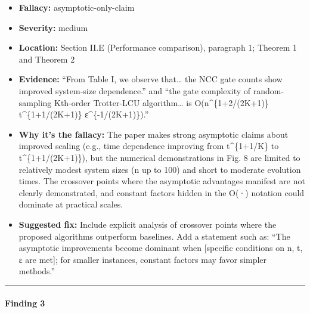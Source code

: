 \documentclass[10pt,letterpaper]{article}
\providecommand{\tightlist}{\setlength{\itemsep}{0pt}\setlength{\parskip}{0pt}}
\begin{document}
\begin{itemize}
\tightlist
\item
  \textbf{Fallacy:} asymptotic-only-claim
\item
  \textbf{Severity:} medium
\item
  \textbf{Location:} Section II.E (Performance comparison), paragraph 1; Theorem 1 and Theorem 2
\item
  \textbf{Evidence:} ``From Table I, we observe that\ldots{} the NCC gate counts show improved system-size dependence.'' and ``the gate complexity of random-sampling Kth-order Trotter-LCU algorithm\ldots{} is O(n\^{}\{1+2/(2K+1)\} t\^{}\{1+1/(2K+1)\} ε\^{}\{-1/(2K+1)\}).''
\item
  \textbf{Why it's the fallacy:} The paper makes strong asymptotic claims about improved scaling (e.g., time dependence improving from t\^{}\{1+1/K\} to t\^{}\{1+1/(2K+1)\}), but the numerical demonstrations in Fig. 8 are limited to relatively modest system sizes (n up to 100) and short to moderate evolution times. The crossover points where the asymptotic advantages manifest are not clearly demonstrated, and constant factors hidden in the O(·) notation could dominate at practical scales.
\item
  \textbf{Suggested fix:} Include explicit analysis of crossover points where the proposed algorithms outperform baselines. Add a statement such as: ``The asymptotic improvements become dominant when {[}specific conditions on n, t, ε are met{]}; for smaller instances, constant factors may favor simpler methods.''
\end{itemize}

\begin{center}\rule{0.5\linewidth}{0.5pt}\end{center}

\hypertarget{finding-3}{%
\paragraph{Finding 3}\label{finding-3}}
\end{document}
